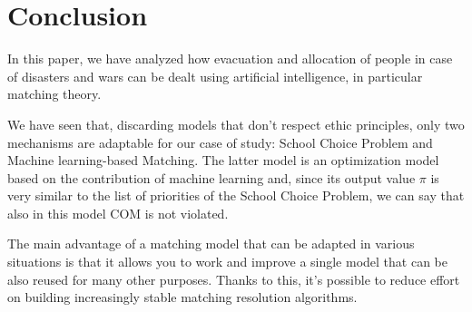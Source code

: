 \section{Conclusion}
In this paper, we have analyzed how evacuation and allocation of people in case of disasters and wars can be dealt using artificial intelligence, in particular matching theory.

We have seen that, discarding models that don’t respect ethic principles, only two mechanisms are adaptable for our case of study: School Choice Problem and Machine learning-based Matching. The latter model is an optimization model based on the contribution of machine learning and, since its output value \(\pi\) is very similar to the list of priorities of the School Choice Problem, we can say that also in this model COM is not violated.

The main advantage of a matching model that can be adapted in various situations is that it allows you to work and improve a single model that can be also reused for many other purposes. Thanks to this, it’s possible to reduce effort on building increasingly stable matching resolution algorithms.

